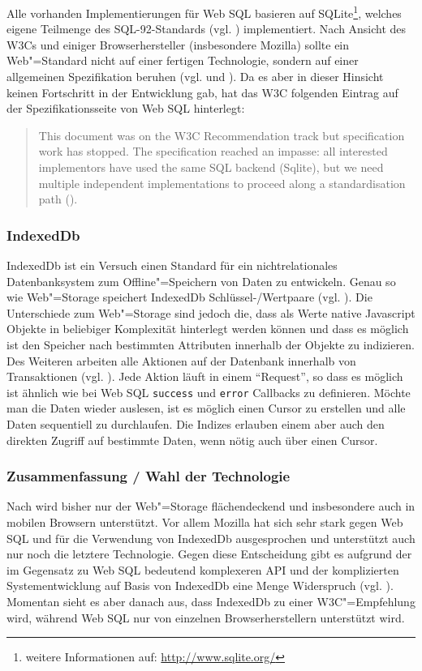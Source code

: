 Alle vorhanden Implementierungen für Web \ac{SQL} basieren auf SQLite\footnote{weitere Informationen auf: \url{http://www.sqlite.org/}}, welches eigene Teilmenge des SQL-92-Standards (vgl. \cite{SQL92}) implementiert. Nach Ansicht des \ac{W3C}s und einiger Browserhersteller (insbesondere Mozilla) sollte ein Web"=Standard nicht auf einer fertigen Technologie, sondern auf einer allgemeinen Spezifikation beruhen (vgl. \cite{W3C2010} und \cite{Ranganathan2010}). Da es aber in dieser Hinsicht keinen Fortschritt in der Entwicklung gab, hat das \ac{W3C} folgenden Eintrag auf der Spezifikationsseite von Web \ac{SQL} hinterlegt:
\begin{quotation}
 This document was on the W3C Recommendation track but specification work has stopped. The specification reached an impasse: all interested implementors have used the same SQL backend (Sqlite), but we need multiple independent implementations to proceed along a standardisation path (\cite{W3C2010}).
\end{quotation} 

\subsubsection*{IndexedDb}
IndexedDb ist ein Versuch einen Standard für ein nichtrelationales Datenbanksystem zum Offline"=Speichern von Daten zu entwickeln. Genau so wie Web"=Storage speichert IndexedDb Schlüssel-/Wertpaare (vgl. \cite{Mehta2012}). Die Unterschiede zum Web"=Storage sind jedoch die, dass als Werte native Javascript Objekte in beliebiger Komplexität hinterlegt werden können und dass es möglich ist den Speicher nach bestimmten Attributen innerhalb der Objekte zu indizieren. Des Weiteren arbeiten alle Aktionen auf der Datenbank innerhalb von Transaktionen (vgl. \cite{MDN2011}).  Jede Aktion läuft in einem "`Request"', so dass es möglich ist ähnlich wie bei Web \ac{SQL} \texttt{success} und \texttt{error} Callbacks zu definieren. Möchte man die Daten wieder auslesen, ist es möglich einen Cursor zu erstellen und alle Daten sequentiell zu durchlaufen. Die Indizes erlauben einem aber auch den direkten Zugriff auf bestimmte Daten, wenn nötig auch über einen Cursor.

\subsubsection*{Zusammenfassung / Wahl der Technologie}
Nach \cite{html5upandrunning} wird bisher nur der Web"=Storage flächendeckend und insbesondere auch in mobilen Browsern unterstützt. Vor allem Mozilla hat sich sehr stark gegen Web \ac{SQL} und für die Verwendung von IndexedDb ausgesprochen und unterstützt auch nur noch die letztere Technologie. Gegen diese Entscheidung gibt es aufgrund der im Gegensatz zu Web \ac{SQL} bedeutend komplexeren \ac{API} und der komplizierten Systementwicklung auf Basis von IndexedDb eine Menge Widerspruch (vgl. \cite{Ranganathan2010}). Momentan sieht es aber danach aus, dass IndexedDb zu einer \ac{W3C}"=Empfehlung wird, während Web \ac{SQL} nur von einzelnen Browserherstellern unterstützt wird.

